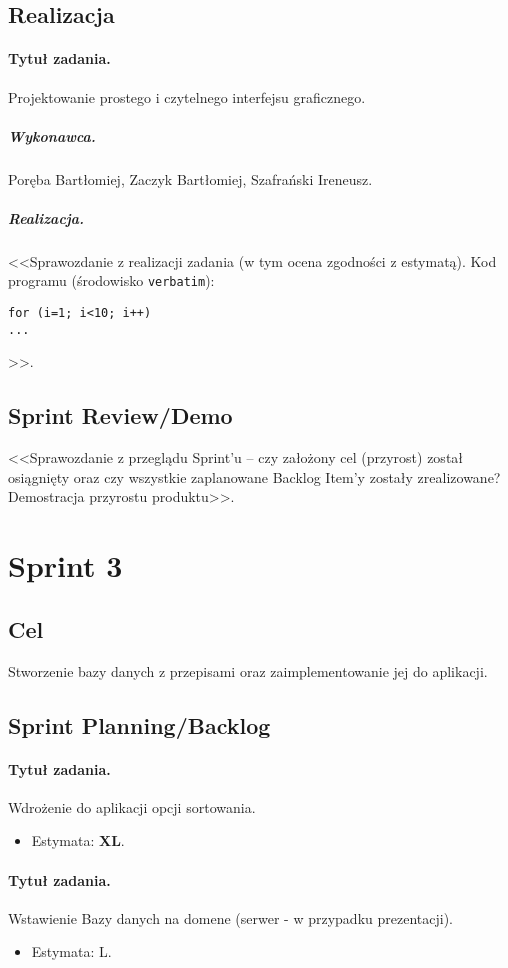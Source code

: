 \documentclass[a4paper]{article}
\begin{document}
\subsection{Realizacja}

\paragraph{Tytuł zadania.} Projektowanie prostego i czytelnego interfejsu graficznego.
\subparagraph{Wykonawca.} Poręba Bartłomiej, Zaczyk Bartłomiej, Szafrański Ireneusz.
\subparagraph{Realizacja.} <<Sprawozdanie z realizacji zadania (w tym ocena zgodności z estymatą). Kod programu (środowisko \texttt{verbatim}): \begin{verbatim}
for (i=1; i<10; i++)
...
\end{verbatim}>>.


\subsection{Sprint Review/Demo}
<<Sprawozdanie z przeglądu Sprint'u -- czy założony cel (przyrost) został osiągnięty oraz czy wszystkie zaplanowane Backlog Item'y zostały zrealizowane? Demostracja przyrostu produktu>>.


\section{Sprint 3}

\subsection{Cel} Stworzenie bazy danych z przepisami oraz zaimplementowanie jej do aplikacji.

\subsection{Sprint Planning/Backlog}

\paragraph{Tytuł zadania.} Wdrożenie do aplikacji opcji sortowania.
\begin{itemize}
	\item Estymata: \textbf{XL}.
\end{itemize}

\paragraph{Tytuł zadania.} Wstawienie Bazy danych na domene (serwer - w przypadku prezentacji).
\begin{itemize}
	\item Estymata: L.
\end{itemize}
\end{document}

